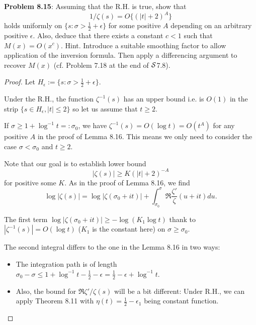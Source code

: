 \documentclass[12pt]{article}
\begin{document}
\fi

\textbf{Problem 8.15}: Assuming that the R.H. is true, show that
$$1/\zeta(s) = O\{(|t| + 2)^A\}$$
holds uniformly on $\{s : \sigma > \frac12 + \epsilon\}$ for some positive $A$ depending on an arbitrary positive $\epsilon$. Also, deduce that there exists a constant $c < 1$ such that $M(x) = O(x^c)$. Hint. Introduce a suitable smoothing factor to allow application of the inversion formula. Then apply a differencing argument to recover $M(x)$ (cf. Problem 7.18 at the end of $\S$7.8).

\begin{proof}
Let $H_\epsilon := \{s : \sigma > \frac12 + \epsilon\}$.

Under the R.H., the function $\zeta^{-1}(s)$ has an upper bound i.e. is $O(1)$ in the strip $\{s \in H_\epsilon, |t| \leq 2 \}$ so let us assume that $t \geq 2$.

If $\sigma \geq 1 + \log^{-1} t =: \sigma_0$, we have $\zeta^{-1}(s) = O(\log t) = O(t^A)$ for any positive $A$ in the proof of Lemma 8.16. This means we only need to consider the case $\sigma < \sigma_0$ and $t \geq 2$.

Note that our goal is to establish lower bound
$$|\zeta(s)| \geq K (|t| + 2)^{-A}$$
for positive some $K$. As in the proof of Lemma 8.16, we find
$$\log|\zeta(s)| = \log |\zeta(\sigma_0 + it)| + \int_{\sigma_0}^\sigma \Re \frac{\zeta'}{\zeta}(u + it) du.$$

The first term $\log |\zeta(\sigma_0 + it)| \geq -\log(K_1 \log t)$ thank to $|\zeta^{-1}(s)| = O(\log t)$ ($K_1$ is the constant here) on $\sigma \geq \sigma_0$.

The second integral differs to the one in the Lemma 8.16 in two ways:
\begin{itemize}
\item The integration path is of length $\sigma_0 - \sigma \leq 1 + \log^{-1} t - \frac12 - \epsilon = \frac12 - \epsilon + \log^{-1} t$.
\item Also, the bound for $\Re \zeta'/\zeta(s)$ will be a bit different: Under R.H., we can apply Theorem 8.11 with $\eta(t) = \frac{1}{2} - \epsilon_1$ being constant function.


\end{itemize}
\end{proof}
\end{document}
